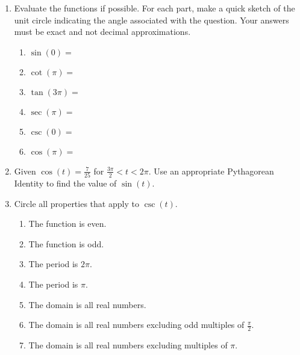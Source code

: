 



\begin{enumerate}
\item Evaluate the functions if possible. For each part, make a quick
  sketch of the unit circle indicating the angle associated with the
  question. Your answers must be exact and not decimal approximations.

\begin{enumerate}

\item $\sin(0)=$\vfill
\item $\cot(\pi)=$\vfill
\item $\tan(3\pi)=$\vfill
\item $\sec(\pi)=$\vfill
\item $\csc(0)=$\vfill
\item $\cos(\pi)=$\vfill
\end{enumerate}




\clearpage


\item  Given $ \displaystyle \cos(t)=\frac{7}{25}$ for $\displaystyle \frac{3\pi}{2}<t<2\pi$.  Use an appropriate Pythagorean Identity to find the value of $\sin(t)$.\vfill

\item  Circle all properties that apply to $\csc(t)$.
\begin{enumerate}
\item The function is even.
\item The function is odd.
\item The period is $2\pi$.
\item The period is $\pi$.
\item The domain is all real numbers.
\item The domain is all real numbers excluding odd multiples of $\frac{\pi}{2}$.
\item The domain is all real numbers excluding multiples of $\pi$.
\end{enumerate}



\end{enumerate}



